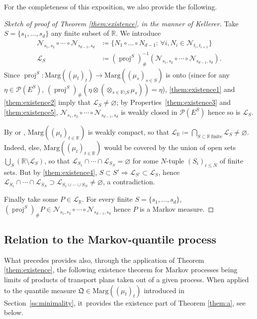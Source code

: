 \documentclass[JEP,XML,SOM,Unicode,NoEqCountersInSection,NoFloatCountersInSection,published]{cedram}
\theoremstyle{plain}
\theoremstyle{definition}
\newcommand{\como}{\mathfrak{Q}}
\newcommand{\eqdef}{\coloneqq}
\newcommand{\eqdefup}{\coloneqq}
\newcommand{\p}{\mathcal{P}}
\newcommand{\ma}{\mathrm{Marg}}
\newcommand{\R}{\mathbb{R}}
\newcommand{\pr}{\operatorname{proj}}
\begin{document}
For the completeness of this exposition, we also provide the following.

\begin{proof}[Sketch of proof of Theorem \ref{them:existence}, in the manner of Kellerer]\label{proof:them:existence} Take $S=\{s_1,\ldots,s_d\}$ any finite subset of $\R$. We introduce
\begin{align*}
\mathcal{N}_{s_1,s_2}\circ\cdots\circ\mathcal{N}_{s_{d-1},s_d}&\eqdef\{N_1\circ\ldots\circ N_{d-1}:\,\forall i, N_i\in\mathcal{N}_{t_i,t_{i+1}}\}\\
\tag*{and}
\mathcal{L}_S&\eqdefup(\pr^S)_\#^{-1}(\mathcal{N}_{s_1,s_2}\circ\cdots\circ\mathcal{N}_{s_{d-1},s_d}).
\end{align*}
Since $\pr^S:\ma((\mu_t)_t)\to\ma((\mu_s)_{s\in S})$ is onto (since for any $\eta\in\p(E^S)$, $(\pr^S)_\#(\eta\otimes(\otimes_{s\in \R\setminus S}\mu_s))=\eta$), \eqref{them:existence1} and \eqref{them:existence2} imply that $\mathcal{L}_S\neq\varnothing$; by Properties~\eqref{them:existence3} and \eqref{them:existence5}, $\mathcal{N}_{s_1,s_2}\circ\cdots\circ\mathcal{N}_{s_{d-1},s_d}$ is weakly closed in $\p(E^S)$ hence so is $\mathcal{L}_S$.

By \cite[\S 1.2]{Ke72} or \cite[\S 2]{BHS}, $\ma((\mu_t)_{t\in \R})$ is weakly compact, so that $\mathcal{L}_\R\eqdef\bigcap_{S\subset \R\ \text{finite}}\mathcal{L}_S\neq\varnothing$. Indeed, else, $\ma((\mu_t)_{t\in \R})$ would be covered by the union of open sets $\bigcup_S(\R\setminus\mathcal{L}_S)$, so that $\mathcal{L}_{S_1}\cap\cdots \cap \mathcal{L}_{S_N}=\varnothing$ for some $N$-tuple $(S_i)_{i\leq N}$ of finite sets. But by \eqref{them:existence4}, $S\subset S'\Rightarrow \mathcal{L}_{S'}\subset \mathcal{L}_{S}$, hence $\mathcal{L}_{S_1}\cap\cdots \cap \mathcal{L}_{S_N}\supset\mathcal{L}_{S_1\cup\cdots\cup S_N}\neq\varnothing$, a contradiction.

Finally take some $P\in\mathcal{L}_\R$. For every finite $S=\{s_1,\ldots,s_d\}$, $(\pr^S)_\#P\in\mathcal{N}_{s_1,s_2}\circ\cdots\circ\mathcal{N}_{s_{d-1},s_d}$ hence $P$ is a Markov measure.
\end{proof}

\subsection{Relation to the Markov-quantile process}\label{subsec:markovinification}

What precedes provides also, through the application of Theorem \ref{them:existence}, the following existence theorem for Markov processes being limits of products of transport plans taken out of a given process. When applied to the quantile measure $\como\in\ma((\mu_t)_t)$ introduced in Section~\ref{ss:minimality}, it~provides the existence part of Theorem \ref{them:a}, see below.
\end{document}
